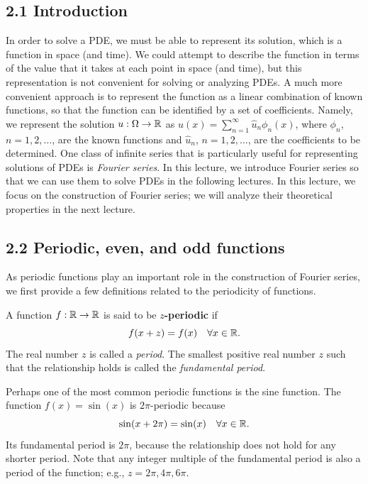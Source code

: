 

\subsection{2.1 Introduction}
In order to solve a PDE, we must be able to represent its solution, which is a function in space (and time). We could attempt to describe the function in terms of the value that it takes at each point in space (and time), but this representation is not convenient for solving or analyzing PDEs. A much more convenient approach is to represent the function as a linear combination of known functions, so that the function can be identified by a set of coefficients. Namely, we represent the solution $u : \Omega \to \mathbb{R}$ as $u(x) = \sum_{n=1}^{\infty} \hat{u}_n \phi_n(x)$, where $\phi_n$, $n = 1, 2, \dots$, are the known functions and $\hat{u}_n$, $n = 1, 2, \dots$, are the coefficients to be determined. One class of infinite series that is particularly useful for representing solutions of PDEs is \textit{Fourier series}. In this lecture, we introduce Fourier series so that we can use them to solve PDEs in the following lectures. In this lecture, we focus on the construction of Fourier series; we will analyze their theoretical properties in the next lecture.

\subsection{2.2 Periodic, even, and odd functions}
As periodic functions play an important role in the construction of Fourier series, we first provide a few definitions related to the periodicity of functions.

\begin{definition}
    A function $f : \mathbb{R} \to \mathbb{R}$ is said to be \textbf{$z$-periodic} if
    \[f(x + z) = f(x) \quad \forall x \in \mathbb{R}.\]
    The real number $z$ is called a \textit{period}. The smallest positive real number $z$ such that the relationship holds is called the \textit{fundamental period}.
\end{definition}

\begin{example}
    Perhaps one of the most common periodic functions is the sine function. The function $f(x) = \sin(x)$ is $2\pi$-periodic because
    \[\sin(x + 2\pi) = \sin(x) \quad \forall x \in \mathbb{R}.\]
    Its fundamental period is $2\pi$, because the relationship does not hold for any shorter period. Note that any integer multiple of the fundamental period is also a period of the function; e.g., $z = 2\pi, 4\pi, 6\pi$.
\end{example}

